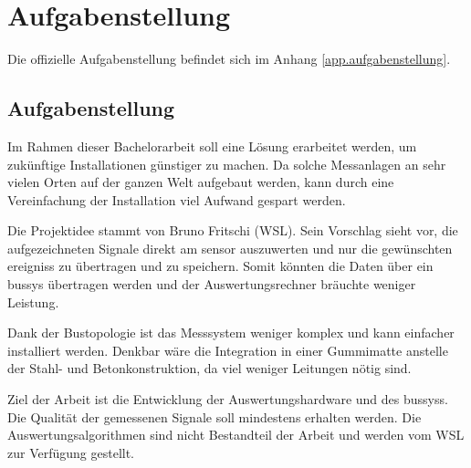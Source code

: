 %
%

\chapter{Aufgabenstellung}\label{chap.aufgabenstellung}

Die offizielle Aufgabenstellung befindet sich im Anhang \ref{app.aufgabenstellung}.

\section{Aufgabenstellung}\label{sec.aufgabenstellung}
Im Rahmen dieser Bachelorarbeit soll eine Lösung erarbeitet werden, um zukünftige Installationen günstiger zu machen. Da solche Messanlagen an sehr vielen Orten auf der ganzen Welt aufgebaut werden, kann durch eine Vereinfachung der Installation viel Aufwand gespart werden. 

Die Projektidee stammt von Bruno Fritschi (WSL). Sein Vorschlag sieht vor, die aufgezeichneten Signale direkt am \gls{sensor} auszuwerten und nur die gewünschten \glspl{ereignis} zu übertragen und zu speichern. Somit könnten die Daten über ein \gls{bussys} übertragen werden und der Auswertungsrechner bräuchte weniger Leistung.

Dank der Bustopologie ist das Messsystem weniger komplex und kann einfacher installiert werden. Denkbar wäre die Integration in einer Gummimatte anstelle der Stahl- und Betonkonstruktion, da viel weniger Leitungen nötig sind.

Ziel der Arbeit ist die Entwicklung der Auswertungshardware und des \gls{bussys}s. Die Qualität der gemessenen Signale soll mindestens erhalten werden. Die Auswertungsalgorithmen sind nicht Bestandteil der Arbeit und werden vom WSL zur Verfügung gestellt.

